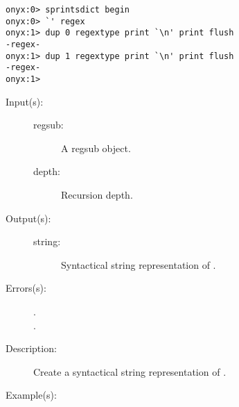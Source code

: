 \begin{description}
\begin{description}
\begin{verbatim}
onyx:0> sprintsdict begin
onyx:0> `' regex
onyx:1> dup 0 regextype print `\n' print flush
-regex-
onyx:1> dup 1 regextype print `\n' print flush
-regex-
onyx:1>
		\end{verbatim}
	\end{description}
\label{sprintsdict:regsubtype}
\item[{\onyxop{regsub depth}{regsubtype}{string}}: ]
	\begin{description}\item[]
	\item[Input(s): ]
		\begin{description}\item[]
		\item[regsub: ]
			A regsub object.
		\item[depth: ]
			Recursion depth.
		\end{description}
	\item[Output(s): ]
		\begin{description}\item[]
		\item[string: ]
			Syntactical string representation of .
		\end{description}
	\item[Errors(s): ]
		\begin{description}\item[]
		\item[.]
		\item[.]
		\end{description}
	\item[Description: ]
		Create a syntactical string representation of .
	\item[Example(s): ]\begin{verbatim}


\end{verbatim}
\end{description}
\end{description}
